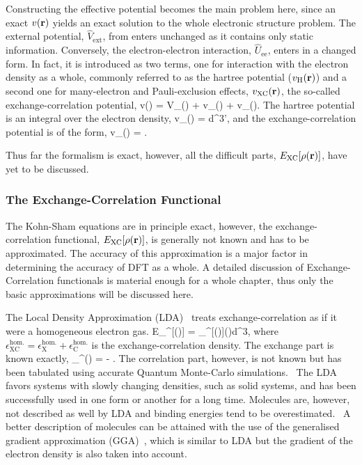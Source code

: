 Constructing the effective potential becomes the main problem here, since an exact $v({\mathrm{\mathbf{\bm{r}}}})$ yields an exact solution to the whole electronic structure problem.
The external potential, $\widehat{V}_\text{ext}$, from  enters unchanged as it contains only static information.
Conversely, the electron-electron interaction, $\widehat{U}_\text{ee}$, enters in a changed form.
In fact, it is introduced as two terms, one for interaction with the electron density as a whole, commonly referred to as the hartree potential ($v_\text{H}({\mathrm{\mathbf{\bm{r}}}})$) and a second one for many-electron and Pauli-exclusion effects, $v_\text{XC}({\mathrm{\mathbf{\bm{r}}}})$, the so-called exchange-correlation potential,
v(\vr) = V_(\vr) + v_(\vr) + v_(\vr).
\eeq
The hartree potential is an integral over the electron density,
v_(\vr) = \int {}d^3\vr',
\eeq
and the exchange-correlation potential is of the form,
v_(\vr) = .
\eeq

Thus far the formalism is exact, however, all the difficult parts, $E_\text{XC}[\rho({\mathrm{\mathbf{\bm{r}}}})]$, have yet to be discussed.

\subsubsection{The Exchange-Correlation Functional}
The Kohn-Sham equations are in principle exact, however, the exchange-correlation functional, $E_\text{XC}[\rho({\mathrm{\mathbf{\bm{r}}}})]$, is generally not known and has to be approximated.
The accuracy of this approximation is a major factor in determining the accuracy of DFT as a whole.
A detailed discussion of Exchange-Correlation functionals is material enough for a whole chapter, thus only the basic approximations will be discussed here.

The Local Density Approximation (LDA)~\cite{kohn-sham-1965} treats exchange-correlation as if it were a homogeneous electron gas.
E_^[\rho(\vr)] = \int \epsilon_^[\rho(\vr)]\rho(\vr)d^3\vr,
\eeq
where $\epsilon_\text{XC}^\text{hom.} = \epsilon_\text{X}^\text{hom.} + \epsilon_\text{C}^\text{hom.}$ is the exchange-correlation density.
The exchange part is known exactly,
\epsilon_^(\vr) = -   \int {}.
\eeq
The correlation part, however, is not known but has been tabulated using accurate Quantum Monte-Carlo simulations.~\cite{correlation-1980}
The LDA favors systems with slowly changing densities, such as solid systems, and has been successfully used in one form or another for a long time.
Molecules are, however, not described as well by LDA and binding energies tend to be overestimated.~\cite{lda-gga-bond-energies-1991, lda-gga-bond-energies-1992}
A better description of molecules can be attained with the use of the generalised gradient approximation (GGA)~\cite{gga-original-1986, gga-1996}, which is similar to LDA but the gradient of the electron density is also taken into account.

